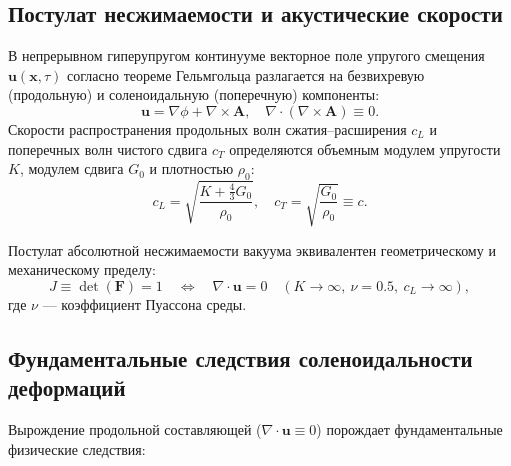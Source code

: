 \documentclass[12pt,a4paper]{article}
\begin{document}
	\subsection{Постулат несжимаемости и акустические скорости}
	В непрерывном гиперупругом континууме векторное поле упругого смещения $\mathbf{u}(\mathbf{x}, \tau)$ согласно теореме Гельмгольца разлагается на безвихревую (продольную) и соленоидальную (поперечную) компоненты:
	\begin{equation}
		\mathbf{u} = \nabla \phi + \nabla \times \mathbf{A}, \quad \nabla \cdot (\nabla \times \mathbf{A}) \equiv 0.
	\end{equation}
	Скорости распространения продольных волн сжатия--расширения $c_L$ и поперечных волн чистого сдвига $c_T$ определяются объемным модулем упругости $K$, модулем сдвига $G_0$ и плотностью $\rho_0$:
	\begin{equation}
		c_L = \sqrt{\frac{K + \frac{4}{3}G_0}{\rho_0}}, \quad c_T = \sqrt{\frac{G_0}{\rho_0}} \equiv c.
	\end{equation}
	
	Постулат абсолютной несжимаемости вакуума эквивалентен геометрическому и механическому пределу:
	\begin{equation}
		J \equiv \det(\mathbf{F}) = 1 \quad \Longleftrightarrow \quad \nabla \cdot \mathbf{u} = 0 \quad (K \to \infty, \ \nu = 0.5, \ c_L \to \infty),
	\end{equation}
	где $\nu$ --- коэффициент Пуассона среды.
	
	\subsection{Фундаментальные следствия соленоидальности деформаций}
	Вырождение продольной составляющей ($\nabla \cdot \mathbf{u} \equiv 0$) порождает фундаментальные физические следствия:
	
\end{document}
